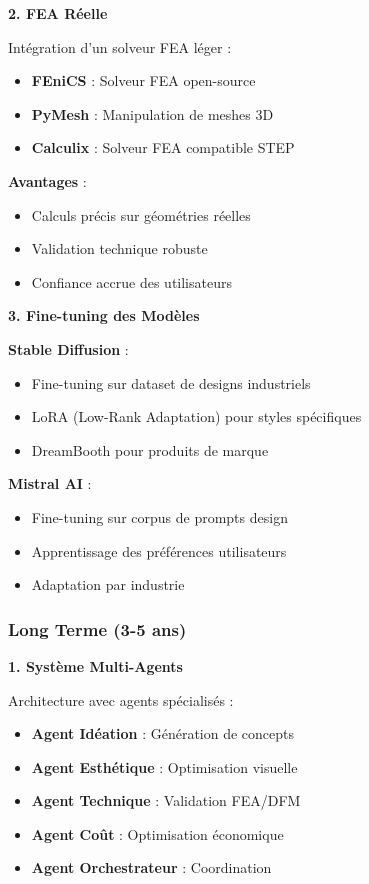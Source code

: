 \textbf{2. FEA Réelle}

Intégration d'un solveur FEA léger :
\begin{itemize}[leftmargin=*]
    \item \textbf{FEniCS} : Solveur FEA open-source
    \item \textbf{PyMesh} : Manipulation de meshes 3D
    \item \textbf{Calculix} : Solveur FEA compatible STEP
\end{itemize}

\textbf{Avantages} :
\begin{itemize}[leftmargin=*]
    \item Calculs précis sur géométries réelles
    \item Validation technique robuste
    \item Confiance accrue des utilisateurs
\end{itemize}

\textbf{3. Fine-tuning des Modèles}

\textbf{Stable Diffusion} :
\begin{itemize}[leftmargin=*]
    \item Fine-tuning sur dataset de designs industriels
    \item LoRA (Low-Rank Adaptation) pour styles spécifiques
    \item DreamBooth pour produits de marque
\end{itemize}

\textbf{Mistral AI} :
\begin{itemize}[leftmargin=*]
    \item Fine-tuning sur corpus de prompts design
    \item Apprentissage des préférences utilisateurs
    \item Adaptation par industrie
\end{itemize}

\subsubsection{Long Terme (3-5 ans)}

\textbf{1. Système Multi-Agents}

Architecture avec agents spécialisés :
\begin{itemize}[leftmargin=*]
    \item \textbf{Agent Idéation} : Génération de concepts
    \item \textbf{Agent Esthétique} : Optimisation visuelle
    \item \textbf{Agent Technique} : Validation FEA/DFM
    \item \textbf{Agent Coût} : Optimisation économique
    \item \textbf{Agent Orchestrateur} : Coordination
\end{itemize}

